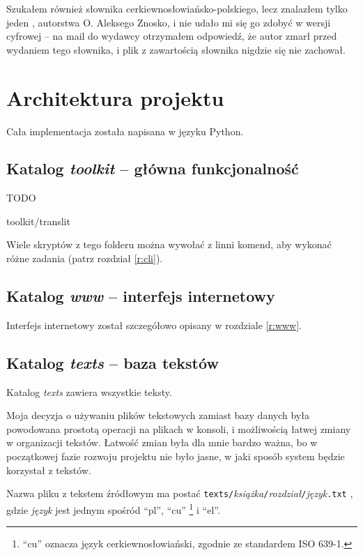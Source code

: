 \documentclass{pracamgr}
\begin{document}
Szukałem również słownika cerkiewno\-{}słowiańsko-polskiego, lecz
znalazłem tylko jeden \cite{znosko}, autorstwa O. Aleksego Znosko, i
nie udało mi się go zdobyć w wersji cyfrowej -- na mail do wydawcy
otrzymałem odpowiedź, że autor zmarł przed wydaniem tego słownika, i
plik z zawartością słownika nigdzie się nie zachował.


\chapter{Architektura projektu}

Cała implementacja została napisana w języku Python.

\section{Katalog \textit{toolkit} -- główna funkcjonalność}

TODO

toolkit/translit

Wiele skryptów z tego folderu można wywołać z linni komend, aby
wykonać różne zadania (patrz rozdział \ref{r:cli}).

\section{Katalog \textit{www} -- interfejs internetowy}

Interfejs internetowy został szczegółowo opisany w rozdziale
\ref{r:www}.

\section{Katalog \textit{texts} -- baza tekstów}

Katalog \textit{texts} zawiera wszystkie teksty.

Moja decyzja o używaniu plików tekstowych zamiast bazy danych była
powodowana prostotą operacji na plikach w konsoli, i możliwością
łatwej zmiany w organizacji tekstów. Łatwość zmian była dla mnie
bardzo ważna, bo w początkowej fazie rozwoju projektu nie było jasne,
w jaki sposób system będzie korzystał z tekstów.

Nazwa pliku z tekstem źródłowym ma postać
{\tt texts/}\textit{książka}{\tt /}\textit{rozdział}{\tt /}\textit{język}{\tt .txt}
, gdzie \textit{język} jest jednym spośród ``pl'', ``cu''
\footnote{``cu'' oznacza język cerkiewnosłowiański, zgodnie ze standardem ISO 639-1.}
 i ``el''.
\end{document}
